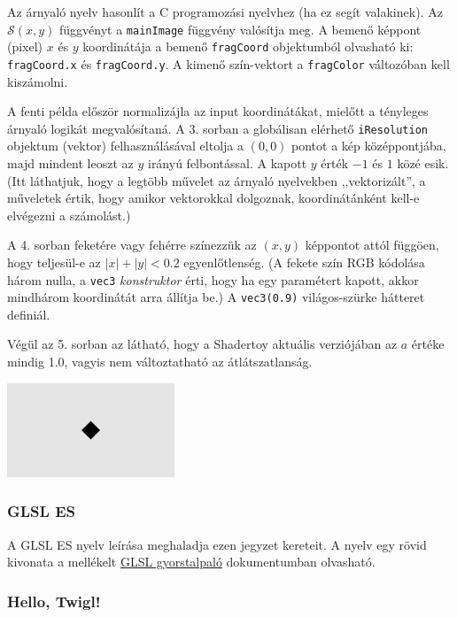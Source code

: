 Az árnyaló nyelv hasonlít a C programozási nyelvhez (ha ez segít valakinek). Az $\mathcal{S}(x,y)$
függvényt a \texttt{mainImage} függvény valósítja meg. A bemenő képpont (pixel) $x$ és $y$ koordinátája
a bemenő \texttt{fragCoord} objektumból olvasható ki: \texttt{fragCoord.x} és \texttt{fragCoord.y}.
A kimenő szín-vektort a \texttt{fragColor} változóban kell kiszámolni.


A fenti példa először normalizájla az input koordinátákat, mielőtt a tényleges árnyaló logikát megvalósítaná.
A 3. sorban a globálisan elérhető \texttt{iResolution} objektum (vektor) felhasználásával eltolja a $(0, 0)$ pontot
a kép középpontjába, majd mindent leoszt az $y$ irányú felbontással. A kapott $y$ érték $-1$ és $1$ közé esik.
(Itt láthatjuk, hogy a legtöbb művelet az árnyaló nyelvekben ,,vektorizált'', a műveletek értik, hogy amikor
vektorokkal dolgoznak, koordinátánként kell-e elvégezni a számolást.)

A 4. sorban feketére vagy fehérre színezzük az $(x, y)$ képpontot attól függöen, hogy teljesül-e
az $|x|+|y| < 0.2$ egyenlőtlenség.
(A fekete szín RGB kódolása három nulla, a \texttt{vec3} \emph{konstruktor}
érti, hogy ha egy paramétert kapott, akkor mindhárom koordinátát arra állítja be.)
A \texttt{vec3(0.9)} világos-szürke hátteret definiál.

Végül az 5. sorban az látható, hogy a Shadertoy aktuális verziójában az $a$ értéke mindig 1.0, vagyis
nem változtatható az átlátszatlanság.

\includegraphics[width=5cm]{images/hello.png}


\subsubsection{GLSL ES}

A GLSL ES nyelv leírása meghaladja ezen jegyzet kereteit.
A nyelv egy rövid kivonata a mellékelt \href{run:./glsl.pdf}{GLSL gyorstalpaló}
dokumentumban olvasható.



\subsubsection{Hello, Twigl!}

